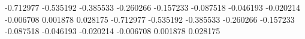 -0.712977
-0.535192
-0.385533
-0.260266
-0.157233
-0.087518
-0.046193
-0.020214
-0.006708
0.001878
0.028175
-0.712977
-0.535192
-0.385533
-0.260266
-0.157233
-0.087518
-0.046193
-0.020214
-0.006708
0.001878
0.028175
